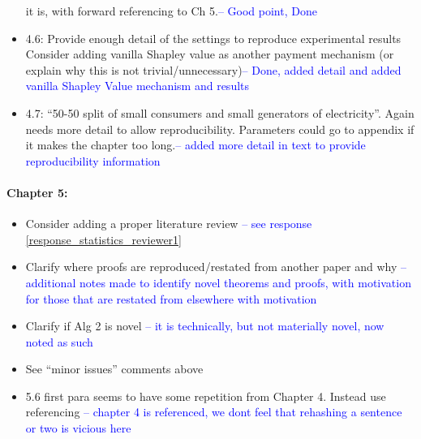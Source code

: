 \documentclass{article}
\begin{document}
\begin{itemize}
it is, with forward referencing to Ch 5.\textcolor{blue}{-- Good point, Done}
\item	4.6: Provide enough detail of the settings to reproduce experimental results
Consider adding vanilla Shapley value as another payment mechanism (or explain why this is
not trivial/unnecessary)\textcolor{blue}{-- Done, added detail and added vanilla Shapley Value mechanism and results}
\item	4.7: “50-50 split of small consumers and small generators of electricity”. Again needs more
detail to allow reproducibility. Parameters could go to appendix if it makes the chapter too
long.\textcolor{blue}{-- added more detail in text to provide reproducibility information}
\end{itemize}

\paragraph{Chapter 5:}\begin{itemize}
\item	Consider adding a proper literature review \textcolor{blue}{-- see response \eqref{response_statistics_reviewer1}}
\item	Clarify where proofs are reproduced/restated from another paper and why \textcolor{blue}{-- additional notes made to identify novel theorems and proofs, with motivation for those that are restated from elsewhere with motivation}
\item	Clarify if Alg 2 is novel \textcolor{blue}{-- it is technically, but not materially novel, now noted as such}
\item	See “minor issues” comments above
\item	5.6 first para seems to have some repetition from Chapter 4. Instead use referencing \textcolor{blue}{-- chapter 4 is referenced, we dont feel that rehashing a sentence or two is vicious here}
\end{itemize}
\end{document}
